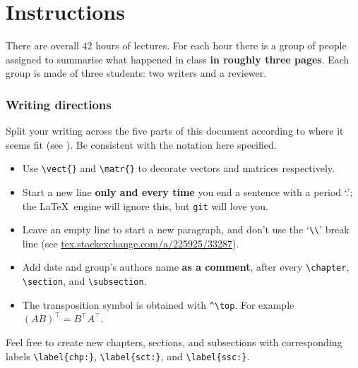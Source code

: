 \chapter*{Instructions}

There are overall 42 hours of lectures.
For each hour there is a group of people assigned to summarise what happened in class \textbf{in roughly three pages}.
Each group is made of three students: two writers and a reviewer.

\subsection*{Writing directions}

Split your writing across the five parts of this document according to where it seems fit (see ).
Be consistent with the notation here specified.
\begin{itemize}[noitemsep,nolistsep]
\item Use \verb|\vect{}| and \verb|\matr{}| to decorate vectors and matrices respectively.
\item Start a new line \textbf{only and every time} you end a sentence with a period `.'; the \LaTeX\ engine will ignore this, but \verb|git| will love you.
\item Leave an empty line to start a new paragraph, and don't use the `\verb|\\|' break line (see \url{tex.stackexchange.com/a/225925/33287}).
\item Add date and group's authors name \textbf{as a comment}, after every \verb|\chapter|, \verb|\section|, and \verb|\subsection|.
\item The transposition symbol is obtained with \verb|^\top|. For example $(AB)^\top = B^\top A^\top$.
\end{itemize}

Feel free to create new chapters, sections, and subsections with corresponding labels \verb|\label{chp:}|, \verb|\label{sct:}|, and \verb|\label{ssc:}|.

